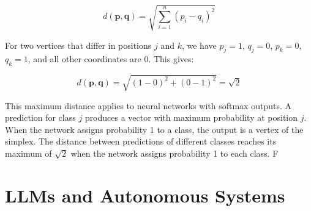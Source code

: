\begin{equation}
d(\mathbf{p}, \mathbf{q}) = \sqrt{\sum_{i=1}^n (p_i - q_i)^2}
\end{equation}

For two vertices that differ in positions $j$ and $k$, we have $p_j = 1$, $q_j = 0$, $p_k = 0$, $q_k = 1$, and all other coordinates are 0. This gives:

\begin{equation}
d(\mathbf{p}, \mathbf{q}) = \sqrt{(1-0)^2 + (0-1)^2} = \sqrt{2}
\end{equation}

This maximum distance applies to neural networks with softmax outputs. A prediction for class $j$ produces a vector with maximum probability at position $j$. When the network assigns probability 1 to a class, the output is a vertex of the simplex. The distance between predictions of different classes reaches its maximum of $\sqrt{2}$ when the network assigns probability 1 to each class.
F
\section{LLMs and Autonomous Systems}
















    
